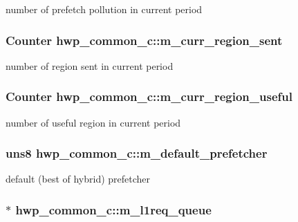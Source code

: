 \label{classhwp__common__c_ac018f13a00b71a4d7570403f3c27c732}
number of prefetch pollution in current period \hypertarget{classhwp__common__c_a0bcd28288b55a82b3d7ed606482e6343}{
\subsubsection[{m\_\-curr\_\-region\_\-sent}]{\setlength{\rightskip}{0pt plus 5cm}Counter {\bf hwp\_\-common\_\-c::m\_\-curr\_\-region\_\-sent}}}
\label{classhwp__common__c_a0bcd28288b55a82b3d7ed606482e6343}
number of region sent in current period \hypertarget{classhwp__common__c_a8cafbef3d36489af200e76b1e9c5b761}{
\subsubsection[{m\_\-curr\_\-region\_\-useful}]{\setlength{\rightskip}{0pt plus 5cm}Counter {\bf hwp\_\-common\_\-c::m\_\-curr\_\-region\_\-useful}}}
\label{classhwp__common__c_a8cafbef3d36489af200e76b1e9c5b761}
number of useful region in current period \hypertarget{classhwp__common__c_a89f3976f4e8523d23045431ad4e02569}{
\subsubsection[{m\_\-default\_\-prefetcher}]{\setlength{\rightskip}{0pt plus 5cm}uns8 {\bf hwp\_\-common\_\-c::m\_\-default\_\-prefetcher}}}
\label{classhwp__common__c_a89f3976f4e8523d23045431ad4e02569}
default (best of hybrid) prefetcher \hypertarget{classhwp__common__c_a77746bacd00943b3f0b05c01cab47c08}{
\subsubsection[{m\_\-l1req\_\-queue}]{$\ast$ {\bf hwp\_\-common\_\-c::m\_\-l1req\_\-queue}}}
